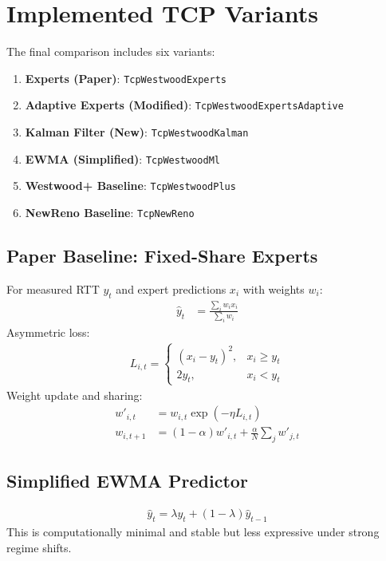 \documentclass[11pt,a4paper]{article}
\begin{document}
\section{Implemented TCP Variants}
The final comparison includes six variants:
\begin{enumerate}
    \item \textbf{Experts (Paper)}: \texttt{TcpWestwoodExperts}
    \item \textbf{Adaptive Experts (Modified)}: \texttt{TcpWestwoodExpertsAdaptive}
    \item \textbf{Kalman Filter (New)}: \texttt{TcpWestwoodKalman}
    \item \textbf{EWMA (Simplified)}: \texttt{TcpWestwoodMl}
    \item \textbf{Westwood+ Baseline}: \texttt{TcpWestwoodPlus}
    \item \textbf{NewReno Baseline}: \texttt{TcpNewReno}
\end{enumerate}

\subsection{Paper Baseline: Fixed-Share Experts}
For measured RTT $y_t$ and expert predictions $x_i$ with weights $w_i$:
\begin{align}
\hat{y}_t &= \frac{\sum_i w_i x_i}{\sum_i w_i}
\end{align}
Asymmetric loss:
\begin{align}
L_{i,t} =
\begin{cases}
(x_i - y_t)^2, & x_i \ge y_t\\
2y_t, & x_i < y_t
\end{cases}
\end{align}
Weight update and sharing:
\begin{align}
w'_{i,t} &= w_{i,t}\exp(-\eta L_{i,t})\\
w_{i,t+1} &= (1-\alpha)w'_{i,t} + \frac{\alpha}{N}\sum_j w'_{j,t}
\end{align}

\subsection{Simplified EWMA Predictor}
\begin{align}
\hat{y}_t = \lambda y_t + (1-\lambda)\hat{y}_{t-1}
\end{align}
This is computationally minimal and stable but less expressive under strong regime shifts.
\end{document}
